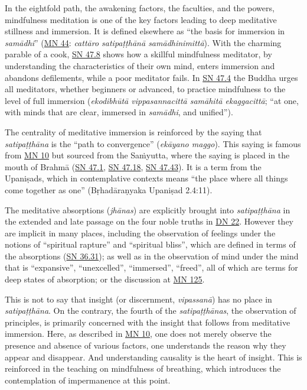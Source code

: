 \documentclass[12pt,openany]{book}%
\begin{document}
In the eightfold path, the awakening factors, the faculties, and the powers, mindfulness meditation is one of the key factors leading to deep meditative stillness and immersion. It is defined elsewhere as “the basis for immersion in \textit{\textsanskrit{samādhi}}” (\href{https://suttacentral.net/mn44}{MN 44}: \textit{\textsanskrit{cattāro} \textsanskrit{satipaṭṭhānā} \textsanskrit{samādhinimittā}}). With the charming parable of a cook, \href{https://suttacentral.net/sn47.8}{SN 47.8} shows how a skillful mindfulness meditator, by understanding the characteristics of their own mind, enters immersion and abandons defilements, while a poor meditator fails. In \href{https://suttacentral.net/sn47.4}{SN 47.4} the Buddha urges all meditators, whether beginners or advanced, to practice mindfulness to the level of full immersion (\textit{\textsanskrit{ekodibhūtā} \textsanskrit{vippasannacittā} \textsanskrit{samāhitā} \textsanskrit{ekaggacittā}}; “at one, with minds that are clear, immersed in \textit{\textsanskrit{samādhi}}, and unified”).

The centrality of meditative immersion is reinforced by the saying that \textit{\textsanskrit{satipaṭṭhāna}} is the “path to convergence” (\textit{\textsanskrit{ekāyano} maggo}). This saying is famous from \href{https://suttacentral.net/mn10}{MN 10} but sourced from the \textsanskrit{Saṁyutta}, where the saying is placed in the mouth of \textsanskrit{Brahmā} (\href{https://suttacentral.net/sn47.1}{SN 47.1}, \href{https://suttacentral.net/sn47.18}{SN 47.18}, \href{https://suttacentral.net/sn47.43}{SN 47.43}). It is a term from the \textsanskrit{Upaniṣads}, which in contemplative contexts means “the place where all things come together as one” (\textsanskrit{Bṛhadāraṇyaka} \textsanskrit{Upaniṣad} 2.4:11).

The meditative absorptions (\textit{\textsanskrit{jhānas}}) are explicitly brought into \textit{\textsanskrit{satipaṭṭhāna}} in the extended and late passage on the four noble truths in \href{https://suttacentral.net/dn22}{DN 22}. However they are implicit in many places, including the observation of feelings under the notions of “spiritual rapture” and “spiritual bliss”, which are defined in terms of the absorptions (\href{https://suttacentral.net/sn36.31}{SN 36.31}); as well as in the observation of mind under the mind that is “expansive”, “unexcelled”, “immersed”, “freed”, all of which are terms for deep states of absorption; or the discussion at \href{https://suttacentral.net/mn125}{MN 125}.

This is not to say that insight (or discernment, \textit{\textsanskrit{vipassanā}}) has no place in \textit{\textsanskrit{satipaṭṭhāna}}. On the contrary, the fourth of the \textit{\textsanskrit{satipaṭṭhānas}}, the observation of principles, is primarily concerned with the insight that follows from meditative immersion. Here, as described in \href{https://suttacentral.net/mn10}{MN 10}, one does not merely observe the presence and absence of various factors, one understands the reason why they appear and disappear. And understanding causality is the heart of insight. This is reinforced in the teaching on mindfulness of breathing, which introduces the contemplation of impermanence at this point.
\end{document}
